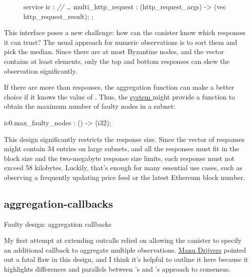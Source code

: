\documentclass{article}
\begin{document}
\begin{figure}
\begin{code}[candid]
service ic : {
    \emph{// \ldots}
    multi_http_request : (http_request_args) -> (vec http_request_result);
};
\end{code}
\end{figure}

This interface poses a new challenge: how can the canister know which responses it can trust?
The usual approach for numeric observations is to sort them and pick the median. 
Since there are at most  Byzantine nodes, and the  vector contains at least  elements, only the top and bottom  responses can skew the observation significantly.

If there are more than  responses, the aggregation function can make a better choice if it knows the value of .
Thus, the \href{https://internetcomputer.org/docs/current/references/ic-interface-spec/#system-api}{system } might provide a function to obtain the maximum number of faulty nodes in a subnet:

\begin{code}
ic0.max_faulty_nodes : () -> (i32);
\end{code}

This design significantly restricts the  response size.
Since the vector of responses might contain 34 entries on large subnets, and all the responses must fit in the block size and the two-megabyte response size limits, each response must not exceed 58 kilobytes.
Luckily, that's enough for many essential use cases, such as observing a frequently updating price feed or the latest Ethereum block number.

\subsection{aggregation-callbacks}{Faulty design: aggregation callbacks}

My first attempt at extending  outcalls relied on allowing the canister to specify an additional callback to aggregate multiple observations.
\href{https://manu.drijve.rs/}{Manu Drijvers} pointed out a fatal flaw in this design, and I think it's helpful to outline it here because it highlights differences and parallels between 's and 's approach to consensus.
\end{document}
